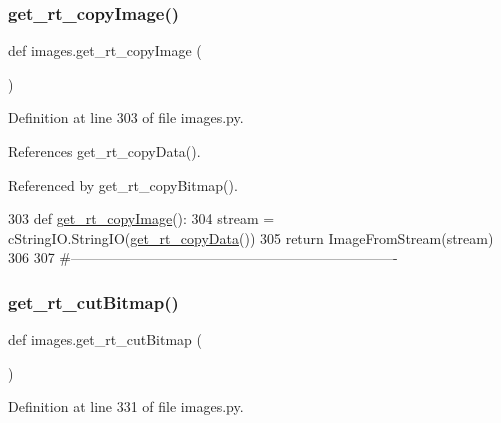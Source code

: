 \mbox{\label{namespaceimages_a969422c25196c4c9142996c542c8e20c}} 
\subsubsection{\texorpdfstring{get\+\_\+rt\+\_\+copy\+Image()}{get\_rt\_copyImage()}}
{\footnotesize\ttfamily def images.\+get\+\_\+rt\+\_\+copy\+Image (\begin{DoxyParamCaption}{ }\end{DoxyParamCaption})}



Definition at line 303 of file images.\+py.



References get\+\_\+rt\+\_\+copy\+Data().



Referenced by get\+\_\+rt\+\_\+copy\+Bitmap().


\begin{DoxyCode}
303 \textcolor{keyword}{def }\hyperlink{namespaceimages_a969422c25196c4c9142996c542c8e20c}{get\_rt\_copyImage}():
304     stream = cStringIO.StringIO(\hyperlink{namespaceimages_ab5eacef04318a348f0c9e295ce5f6a64}{get\_rt\_copyData}())
305     \textcolor{keywordflow}{return} ImageFromStream(stream)
306 
307 \textcolor{comment}{#----------------------------------------------------------------------}
\end{DoxyCode}
\mbox{\label{namespaceimages_abf3deb680d420f30bc46ab3d8eb77dd9}} 
\subsubsection{\texorpdfstring{get\+\_\+rt\+\_\+cut\+Bitmap()}{get\_rt\_cutBitmap()}}
{\footnotesize\ttfamily def images.\+get\+\_\+rt\+\_\+cut\+Bitmap (\begin{DoxyParamCaption}{ }\end{DoxyParamCaption})}



Definition at line 331 of file images.\+py.



